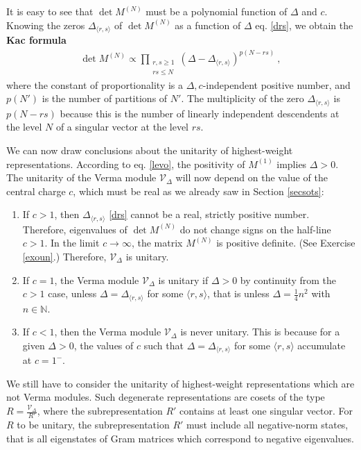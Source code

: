 \documentclass[12pt,a4paper,notitlepage]{report}
\numberwithin{equation}{section}
\theoremstyle{break}
\begin{document}
It is easy to see that $\det M^{(N)}$ must be a polynomial function of $\Delta$ and $c$.
Knowing the zeros $\Delta_{\langle r,s \rangle}$ of $\det M^{(N)}$ as a function of $\Delta$ eq. \eqref{drs}, we obtain the \textbf{\boldmath Kac formula} 
\begin{align}
 \boxed{\det M^{(N)} \propto \prod_{\begin{smallmatrix} r,s\geq 1 \\ rs \leq N \end{smallmatrix}} (\Delta-\Delta_{\langle r,s \rangle})^{p(N-rs)}} \ ,
\end{align}
where the constant of proportionality is a $\Delta,c$-independent positive number, and $p(N')$ is the number of partitions of $N'$.
The multiplicity of the zero $\Delta_{\langle r,s \rangle}$ is $p(N-rs)$ because this is the number of linearly independent descendents at the level $N$ of a singular vector at the level $rs$.  

We can now draw conclusions about the unitarity of highest-weight representations.
According to eq. \eqref{levo}, the positivity of $M^{(1)}$ implies $\Delta >0$. 
The unitarity of the Verma module $\mathcal{V}_\Delta$ will now depend on the value of the central charge $c$, which must be real 
as we already saw in Section \ref{secsots}:
\begin{enumerate}
 \item 
If $c > 1$, then $\Delta_{\langle r,s \rangle}$ \eqref{drs} cannot be a real, strictly positive number. 
Therefore, eigenvalues of $\det M^{(N)}$ do not change signs on the half-line $c > 1$.
In the limit $c \rightarrow \infty$, the matrix $M^{(N)}$ is positive definite. (See Exercise \ref{exoun}.) 
Therefore, $\mathcal{V}_\Delta$ is unitary. 
\item 
If $c=1$, the Verma module $\mathcal{V}_\Delta$ is unitary if $\Delta > 0$ by continuity from the $c>1$ case, unless $\Delta=\Delta_{\langle r,s \rangle}$ for some $\langle r,s \rangle$, that is unless $\Delta =\frac14 n^2$ with $n\in {\mathbb{N}}$.
\item 
If $c<1$, then the Verma module $\mathcal{V}_\Delta$ is never unitary. 
This is because for a given $\Delta>0$, the values of $c$ such that $\Delta = \Delta_{\langle r,s \rangle}$ for some $\langle r,s \rangle$ accumulate at $c=1^-$.
\end{enumerate}

We still have to consider the unitarity of highest-weight representations which are not Verma modules.
Such degenerate representations are cosets of the type $R=\frac{\mathcal{V}_\Delta}{R'}$, where the subrepresentation $R'$ contains at least one singular vector. 
For $R$ to be unitary, the subrepresentation $R'$ must include all negative-norm states, that is all eigenstates of Gram matrices which correspond to negative eigenvalues.
\end{document}
